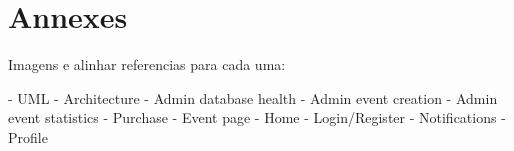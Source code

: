 \documentclass[screen,review]{acmart}
\begin{document}
\section{Annexes}

Imagens e alinhar referencias para cada uma:

- UML
- Architecture
- Admin database health
- Admin event creation
- Admin event statistics
- Purchase
- Event page
- Home
- Login/Register
- Notifications
- Profile





\appendix
\end{document}
